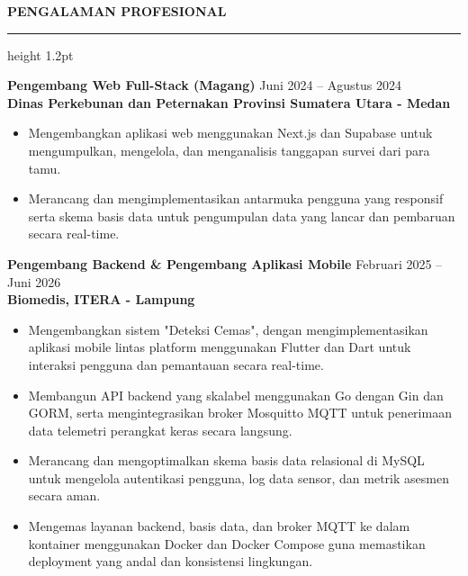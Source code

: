 \documentclass[11pt,a4paper]{article}
\newcommand{\secfontsize}{14}
\newcommand{\seclineheight}{1.2pt}
\newcommand{\secgapabove}{14pt}
\newcommand{\secgaptitle}{6pt}
\newcommand{\secgapbelow}{10pt}
\newcommand{\company}[1]{\textbf{\textcolor{accent}{#1}}}
\newcommand{\cvsection}[1]{%
    \par\vspace{\secgapabove}%
    {\fontsize{\secfontsize}{\numexpr\secfontsize+3\relax}\selectfont\bfseries\scshape #1}\par
    \vspace{\secgaptitle}%
    {\color{black}\hrule height \seclineheight}%
    \vspace{\secgapbelow}%
    \noindent\ignorespaces
}
\begin{document}
\cvsection{PENGALAMAN PROFESIONAL}

\textbf{Pengembang Web Full-Stack (Magang)}
\hfill
Juni 2024 -- Agustus 2024 \\
\company{Dinas Perkebunan dan Peternakan Provinsi Sumatera Utara - Medan}
\begin{itemize}
\item Mengembangkan aplikasi web menggunakan Next.js dan Supabase untuk mengumpulkan, mengelola, dan menganalisis tanggapan survei dari para tamu.
\item Merancang dan mengimplementasikan antarmuka pengguna yang responsif serta skema basis data untuk pengumpulan data yang lancar dan pembaruan secara real-time.
\end{itemize}

\vspace{8pt}

\textbf{Pengembang Backend \& Pengembang Aplikasi Mobile}
\hfill
Februari 2025 -- Juni 2026 \\
\company{Biomedis, ITERA - Lampung}
\begin{itemize}
    \item Mengembangkan sistem "Deteksi Cemas", dengan mengimplementasikan aplikasi mobile lintas platform menggunakan Flutter dan Dart untuk interaksi pengguna dan pemantauan secara real-time.
    \item Membangun API backend yang skalabel menggunakan Go dengan Gin dan GORM, serta mengintegrasikan broker Mosquitto MQTT untuk penerimaan data telemetri perangkat keras secara langsung.
    \item Merancang dan mengoptimalkan skema basis data relasional di MySQL untuk mengelola autentikasi pengguna, log data sensor, dan metrik asesmen secara aman.
    \item Mengemas layanan backend, basis data, dan broker MQTT ke dalam kontainer menggunakan Docker dan Docker Compose guna memastikan deployment yang andal dan konsistensi lingkungan.
\end{itemize}

\vspace{8pt}
\end{document}

